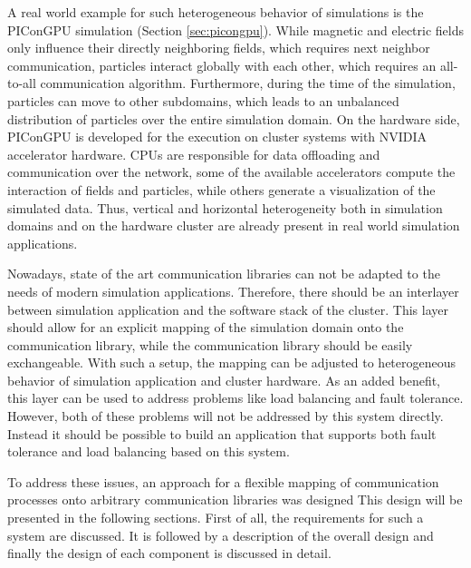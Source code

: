 A real world example for such heterogeneous behavior of simulations is
the PIConGPU simulation (Section \ref{sec:picongpu}). While magnetic
and electric fields only influence their directly neighboring fields,
which requires next neighbor communication, particles interact
globally with each other, which requires an all-to-all communication
algorithm.  Furthermore, during the time of the simulation, particles
can move to other subdomains, which leads to an unbalanced
distribution of particles over the entire simulation domain. On the
hardware side, PIConGPU is developed for the execution on cluster
systems with NVIDIA accelerator hardware.  CPUs are responsible for
data offloading and communication over the network, some of the
available accelerators compute the interaction of fields and
particles, while others generate a visualization of the simulated
data. Thus, vertical and horizontal heterogeneity both in simulation
domains and on the hardware cluster are already present in real world
simulation applications.

Nowadays, state of the art communication libraries can not be adapted
to the needs of modern simulation applications.  Therefore, there
should be an interlayer between simulation application and the
software stack of the cluster. This layer should allow for an explicit
mapping of the simulation domain onto the communication library, while
the communication library should be easily exchangeable. With such a
setup, the mapping can be adjusted to heterogeneous behavior of
simulation application and cluster hardware.  As an added benefit,
this layer can be used to address problems like load balancing and
fault tolerance. However, both of these problems will not be addressed
by this system directly. Instead it should be possible to build an
application that supports both fault tolerance and load balancing
based on this system.

To address these issues, an approach for a flexible mapping of
communication processes onto arbitrary communication libraries was
designed This design will be presented in the following
sections. First of all, the requirements for such a system are
discussed. It is followed by a description of the overall design and
finally the design of each component is discussed in detail.


